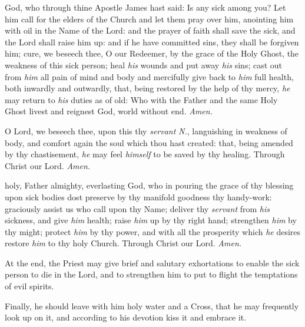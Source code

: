 


{} God, who through thine Apostle James hast said: Is any sick among you? Let him call for the elders of the Church and let them pray over him, anointing him with oil in the Name of the Lord: and the prayer of faith shall save the sick, and the Lord shall raise him up: and if he have committed sins, they shall be forgiven him; cure, we beseech thee, O our Redeemer, by the grace of the Holy Ghost, the weakness of this sick person; heal \textit{his} wounds and put away \textit{his} sins; cast out from \textit{him} all pain of mind and body and mercifully give back to \textit{him} full health, both inwardly and outwardly, that, being restored by the help of thy mercy, \textit{he} may return to \textit{his} duties as of old: Who with the Father and the same Holy Ghost livest and reignest God, world without end. \textit{Amen.}\par
{}
{} O Lord, we beseech thee, upon this thy \textit{servant} \textit{N.}, languishing in weakness of body, and comfort again the soul which thou hast created: that, being amended by thy chastisement, \textit{he} may feel \textit{himself} to be saved by thy healing. Through Christ our Lord. \textit{Amen.}\par
{}
{} holy, Father almighty, everlasting God, who in pouring the grace of thy blessing upon sick bodies dost preserve by thy manifold goodness thy handy-work: graciously assist us who call upon thy Name; deliver thy \textit{servant} from \textit{his} sickness, and give \textit{him} health; raise \textit{him} up by thy right hand; strengthen \textit{him} by thy might; protect \textit{him} by thy power, and with all the prosperity which \textit{he} desires restore \textit{him} to thy holy Church. Through Christ our Lord. \textit{Amen.}
\begin{rubric}
    At the end, the Priest may give brief and salutary exhortations to enable the sick person to die in the Lord, and to strengthen him to put to flight the temptations of evil spirits.
\end{rubric}
\begin{rubric}
    Finally, he should leave with him holy water and a Cross, that he may frequently look up on it, and according to his devotion kiss it and embrace it.
\end{rubric}
